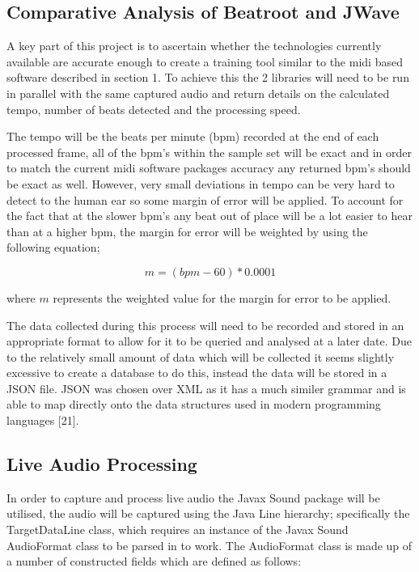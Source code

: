 \documentclass[a4paper, 11pt]{article}
\begin{document}
\subsection{Comparative Analysis of Beatroot and JWave}
A key part of this project is to ascertain whether the technologies currently available are accurate enough to create a training tool similar to the midi based software described in section 1. To achieve this the 2 libraries will need to be run in parallel with the same captured audio and return details on the calculated tempo, number of beats detected and the processing speed. 

The tempo will be the beats per minute (bpm) recorded at the end of each processed frame, all of the bpm's within the sample set will be exact and in order to match the current midi software packages accuracy any returned bpm's should be exact as well. However, very small deviations in tempo can be very hard to detect to the human ear so some margin of error will be applied. To account for the fact that at the slower bpm's any beat out of place will be a lot easier to hear than at a higher bpm, the margin for error will be weighted by using the following equation;

\[ m = (bpm - 60) * 0.0001\]
\begin{flushleft}
where \(m\) represents the weighted value for the margin for error to be applied.
\end{flushleft}
The data collected during this process will need to be recorded and stored in an appropriate format to allow for it to be queried and analysed at a later date. Due to the relatively small amount of data which will be collected it seems slightly excessive to create a database to do this, instead the data will be stored in a JSON file. JSON was chosen over XML as it has a much similer grammar and is able to map directly onto the data structures used in modern programming languages [21].

\subsection{Live Audio Processing}
In order to capture and process live audio the Javax Sound package will be utilised, the audio will be captured using the Java Line hierarchy; specifically the TargetDataLine class, which requires an instance of the Javax Sound AudioFormat class to be parsed in to work. The AudioFormat class is made up of a number of constructed fields which are defined as follows:
\end{document}
